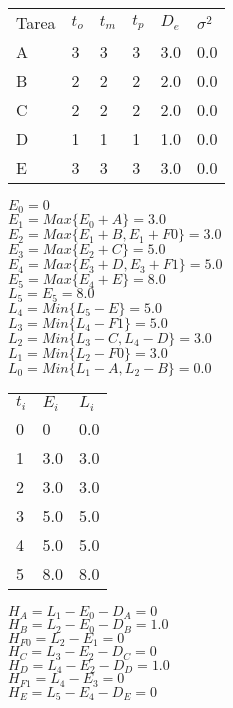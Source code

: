 \raggedright
\begin{table}[h]
\begin{tabular}{llllll}
Tarea & $t_o$ & $t_m$ & $t_p$ & $D_e$ & $\sigma^{2}$ \\
A & 3 & 3 & 3 & 3.0 & 0.0 \\
B & 2 & 2 & 2 & 2.0 & 0.0 \\
C & 2 & 2 & 2 & 2.0 & 0.0 \\
D & 1 & 1 & 1 & 1.0 & 0.0 \\
E & 3 & 3 & 3 & 3.0 & 0.0 \\
\end{tabular}
\end{table}




$E_0 = 0$\\
$E_1 = Max \{E_0 + A\} = 3.0$\\
$E_2 = Max \{E_1 + B, E_1 + F0\} = 3.0$\\
$E_3 = Max \{E_2 + C\} = 5.0$\\
$E_4 = Max \{E_3 + D, E_3 + F1\} = 5.0$\\
$E_5 = Max \{E_4 + E\} = 8.0$\\
$L_5 = E_5 = 8.0$\\
$L_4 = Min \{L_5 - E\} = 5.0$\\
$L_3 = Min \{L_4 - F1\} = 5.0$\\
$L_2 = Min \{L_3 - C, L_4 - D\} = 3.0$\\
$L_1 = Min \{L_2 - F0\} = 3.0$\\
$L_0 = Min \{L_1 - A, L_2 - B\} = 0.0$\\




\begin{table}[h]
\begin{tabular}{lll}
$t_i$ & $E_i$ & $L_i$ \\
0 & 0 & 0.0 \\
1 & 3.0 & 3.0 \\
2 & 3.0 & 3.0 \\
3 & 5.0 & 5.0 \\
4 & 5.0 & 5.0 \\
5 & 8.0 & 8.0 \\
\end{tabular}
\end{table}




$H_A = L_1 - E_0 - D_A = 0$\\
$H_B = L_2 - E_0 - D_B = 1.0$\\
$H_{F0} = L_2 - E_1 = 0$\\
$H_C = L_3 - E_2 - D_C = 0$\\
$H_D = L_4 - E_2 - D_D = 1.0$\\
$H_{F1} = L_4 - E_3 = 0$\\
$H_E = L_5 - E_4 - D_E = 0$\\




